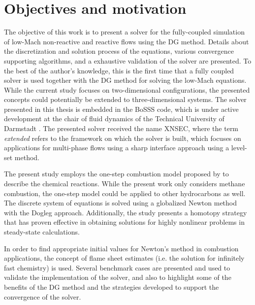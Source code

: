 \section{Objectives and motivation}
The objective of this work is to present a solver for the fully-coupled simulation of low-Mach non-reactive and reactive flows using the \gls{DG} method. Details about the discretization and solution process of the equations, various convergence supporting algorithms, and a exhaustive validation of the solver are presented. To the best of the author's knowledge, this is the first time that a fully coupled solver is used together with the DG method for solving the low-Mach equations. While the current study focuses on two-dimensional configurations, the presented concepts could potentially be extended to three-dimensional systems. The solver presented in this thesis is embedded in the \gls{BoSSS} code, which is under active development at the chair of fluid dynamics of the Technical University of Darmstadt \footnotemark.
The presented solver received the name \gls{XNSEC}, where the term \textit{extended} refers to the framework on which the solver is built, which focuses on applications for multi-phase flows using a sharp interface approach using a level-set method. 

The present study employs the one-step combustion model proposed by \textcite{fernandez-tarrazoSimpleOnestepChemistry2006} to describe the chemical reactions. While the present work only considers methane combustion, the one-step model could be applied to other hydrocarbons as well. The discrete system of equations is solved using a globalized Newton method with the Dogleg approach. Additionally, the study presents a homotopy strategy that has proven effective in obtaining solutions for highly nonlinear problems in steady-state calculations.

In order to find appropriate initial values for Newton's method in combustion applications, the concept of flame sheet estimates (i.e. the solution for infinitely fast chemistry) is used. Several benchmark cases are presented and used to validate the implementation of the solver, and also to highlight  some of the benefits of the DG method and the strategies developed to support the convergence of the solver. 

